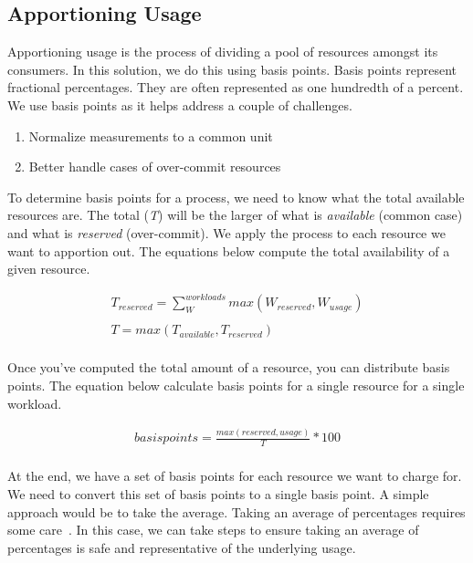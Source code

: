 \documentclass[10pt, a4paper, twocolumn]{article}
\begin{document}
  \subsection*{Apportioning Usage}
    Apportioning usage is the process of dividing a pool of resources amongst its consumers.
    In this solution, we do this using basis points.
    Basis points represent fractional percentages.
    They are often represented as one hundredth of a percent.
    We use basis points as it helps address a couple of challenges.

    \begin{enumerate}
      \item Normalize measurements to a common unit
      \item Better handle cases of over-commit resources
    \end{enumerate}

    To determine basis points for a process, we need to know what the total available resources are.
    The total (\textit{T}) will be the larger of what is \textit{available} (common case) and what is \textit{reserved} (over-commit).
    We apply the process to each resource we want to apportion out.
    The equations below compute the total availability of a given resource.

    \begin{gather*}
      T_{reserved} = \sum^{workloads}_{W} max(W_{reserved}, W_{usage}) \\
      \\
      T = max(T_{available}, T_{reserved}) \\
    \end{gather*}

    Once you've computed the total amount of a resource, you can distribute basis points.
    The equation below calculate basis points for a single resource for a single workload.

    \begin{gather*}
      basispoints = \frac{max(reserved, usage)}{T} * 100 \\
    \end{gather*}

    At the end, we have a set of basis points for each resource we want to charge for.
    We need to convert this set of basis points to a single basis point.
    A simple approach would be to take the average.
    Taking an average of percentages requires some care~\cite{indeed,robertoreif}.
    In this case, we can take steps to ensure taking an average of percentages is safe and representative of the underlying usage.
\end{document}

